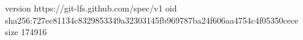 version https://git-lfs.github.com/spec/v1
oid sha256:727ec81134c8329853349a32303145fb969787ba24f606aa4754c4f05350cece
size 174916
